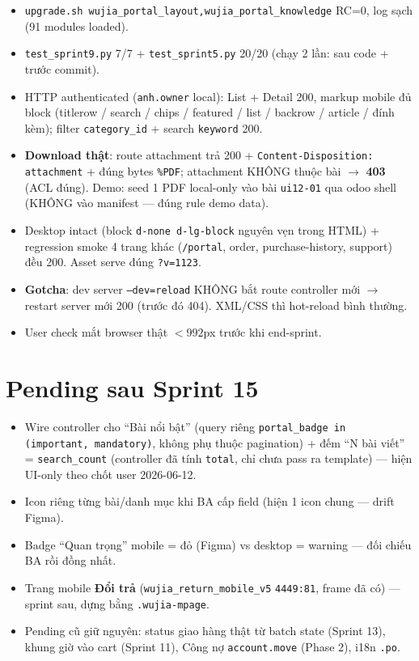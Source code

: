 \begin{itemize}
  \item \texttt{upgrade.sh wujia\_portal\_layout,wujia\_portal\_knowledge} RC=0,
        log sạch (91 modules loaded).
  \item \texttt{test\_sprint9.py} 7/7 + \texttt{test\_sprint5.py} 20/20 (chạy 2 lần:
        sau code + trước commit).
  \item HTTP authenticated (\texttt{anh.owner} local): List + Detail 200, markup
        mobile đủ block (titlerow / search / chips / featured / list / backrow /
        article / đính kèm); filter \texttt{category\_id} + search \texttt{keyword} 200.
  \item \textbf{Download thật}: route attachment trả 200 +
        \texttt{Content-Disposition: attachment} + đúng bytes \texttt{\%PDF};
        attachment KHÔNG thuộc bài \(\rightarrow\) \textbf{403} (ACL đúng).
        Demo: seed 1 PDF local-only vào bài \texttt{ui12-01} qua odoo shell
        (KHÔNG vào manifest --- đúng rule demo data).
  \item Desktop intact (block \texttt{d-none d-lg-block} nguyên vẹn trong HTML) +
        regression smoke 4 trang khác (\texttt{/portal}, order, purchase-history,
        support) đều 200. Asset serve đúng \texttt{?v=1123}.
  \item \textbf{Gotcha}: dev server \texttt{--dev=reload} KHÔNG bắt route controller
        mới \(\rightarrow\) restart server mới 200 (trước đó 404). XML/CSS thì
        hot-reload bình thường.
  \item User check mắt browser thật \(<992\)px trước khi end-sprint.
\end{itemize}

\section{Pending sau Sprint 15}

\begin{itemize}
  \item Wire controller cho ``Bài nổi bật'' (query riêng \texttt{portal\_badge in
        (important, mandatory)}, không phụ thuộc pagination) + đếm ``N bài viết'' =
        \texttt{search\_count} (controller đã tính \texttt{total}, chỉ chưa pass ra
        template) --- hiện UI-only theo chốt user 2026-06-12.
  \item Icon riêng từng bài/danh mục khi BA cấp field (hiện 1 icon chung --- drift Figma).
  \item Badge ``Quan trọng'' mobile = đỏ (Figma) vs desktop = warning --- đối chiếu BA
        rồi đồng nhất.
  \item Trang mobile \textbf{Đổi trả} (\texttt{wujia\_return\_mobile\_v5} \texttt{4449:81},
        frame đã có) --- sprint sau, dựng bằng \texttt{.wujia-mpage}.
  \item Pending cũ giữ nguyên: status giao hàng thật từ batch state (Sprint 13),
        khung giờ vào cart (Sprint 11), Công nợ \texttt{account.move} (Phase 2),
        i18n \texttt{.po}.
\end{itemize}
